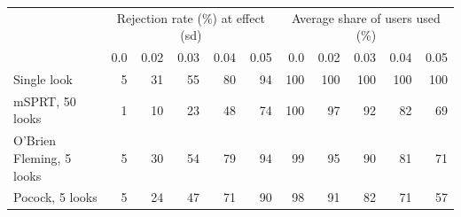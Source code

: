 \begin{tabular}{lrrrrr|rrrrr}
\toprule
 & \multicolumn{5}{c|}{Rejection rate (\%) at effect (sd)} & \multicolumn{5}{c}{Average share of users used (\%)} \\
 & 0.0 & 0.02 & 0.03 & 0.04 & 0.05 & 0.0 & 0.02 & 0.03 & 0.04 & 0.05 \\
\midrule
Single look & 5 & 31 & 55 & 80 & 94 & 100 & 100 & 100 & 100 & 100 \\
mSPRT, 50 looks & 1 & 10 & 23 & 48 & 74 & 100 & 97 & 92 & 82 & 69 \\
O'Brien Fleming, 5 looks & 5 & 30 & 54 & 79 & 94 & 99 & 95 & 90 & 81 & 71 \\
Pocock, 5 looks & 5 & 24 & 47 & 71 & 90 & 98 & 91 & 82 & 71 & 57 \\
\bottomrule
\end{tabular}
